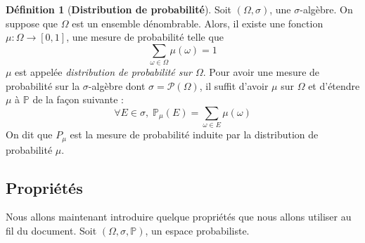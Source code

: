 \documentclass[12pt,a4paper]{report}
\theoremstyle{definition}%
\newtheorem{definition}{Définition}[chapter]
\theoremstyle{remark}
\newcommand{\pr}{\mathbb{P}}
\begin{document}
\begin{definition}[\textbf{Distribution de probabilité}] \label{distriprobadef}
	Soit $(\Omega, \sigma)$, une $\sigma$-algèbre. 
	On suppose que $\Omega$ est un ensemble dénombrable. Alors, il existe une fonction $\mu: \Omega \rightarrow [0,1]$, une mesure de probabilité telle que 
	\[\sum_{\omega \in \Omega} \mu(\omega) =1 \]
	$\mu$ est appelée \textit{distribution de probabilité sur $\Omega$}. Pour avoir une mesure de probabilité sur la $\sigma$-algèbre dont $\sigma = \mathcal{P}(\Omega)$, il suffit d'avoir $\mu$ sur $\Omega$ et d'étendre $\mu$ à $\pr$ de la façon suivante :
	\[ \forall E \in \sigma,\; \mathbb{P}_{\mu}(E) = \sum_{\omega \in E} \mu(\omega)\] On dit que $P_{\mu}$ est la mesure de probabilité induite par la distribution de probabilité $\mu$.
\end{definition}

\subsection*{Propriétés}
	Nous allons maintenant introduire quelque propriétés que nous allons utiliser au fil du document.
	Soit $(\Omega, \sigma, \mathbb{P})$, un espace probabiliste. 
	
\end{document}
